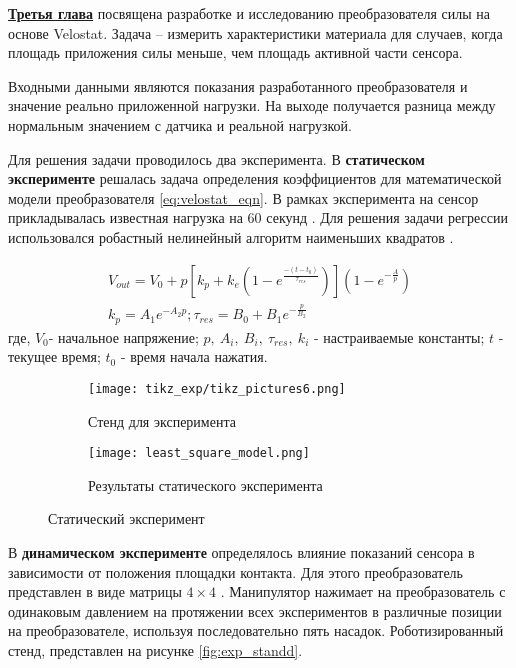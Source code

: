 
\textbf{\underline{Третья глава}} посвящена разработке и исследованию преобразователя силы на основе Velostat. Задача -- измерить характеристики материала для случаев, когда площадь приложения силы меньше, чем площадь активной части сенсора.

Входными данными являются показания разработанного преобразователя и значение реально приложенной нагрузки. На выходе получается разница между нормальным значением с датчика и реальной нагрузкой.

Для решения задачи проводилось два эксперимента. В \textbf{статическом эксперименте} решалась задача определения коэффициентов для математической модели преобразователя \eqref{eq:velostat_eqn}. В рамках эксперимента на сенсор прикладывалась известная нагрузка на 60 секунд . Для решения задачи регрессии использовался робастный нелинейный алгоритм наименьших квадратов .

\begin{align}
    \label{eq:velostat_eqn}
    V_{out} = V_0 + p[k_p + k_e(1-e^\frac{-(t-t_0)}{\tau_{res}})](1-e^{-\frac{A}{p}}) \\
    k_p = A_1e^{-A_2p}; \tau_{res} = B_0 + B_1e^{-\frac{p}{B_2}}
\end{align}
где,  $V_0$- начальное напряжение; $p,\ A_i,\ B_i,\ \tau_{res},\ k_i$  - настраиваемые константы; $t$ - текущее время; $t_0$ - время начала нажатия.


\begin{figure}[h]
    \begin{subfigure}[t]{0.35\textwidth}
        \centering\texttt{[image: tikz\_exp/tikz\_pictures6.png]}
        \caption{Стенд для эксперимента}
        \label{fig:tikz_exp/tikz_pictures6.png}
    \end{subfigure}
    \begin{subfigure}[t]{0.54\textwidth}
        \centering\texttt{[image: least\_square\_model.png]}
        \caption{Результаты статического эксперимента}
        \label{fig:least_square_model.png}
    \end{subfigure}

\caption{Статический эксперимент}
\label{fig:static_expp}
\end{figure}

В \textbf{динамическом эксперименте} определялось влияние показаний сенсора в зависимости от положения площадки контакта. Для этого преобразователь представлен в виде матрицы $4 \times 4$ . Манипулятор нажимает на преобразователь с одинаковым давлением на протяжении всех экспериментов в различные позиции на преобразователе, используя последовательно пять насадок. Роботизированный стенд, представлен на рисунке \ref{fig:exp_standd}.


